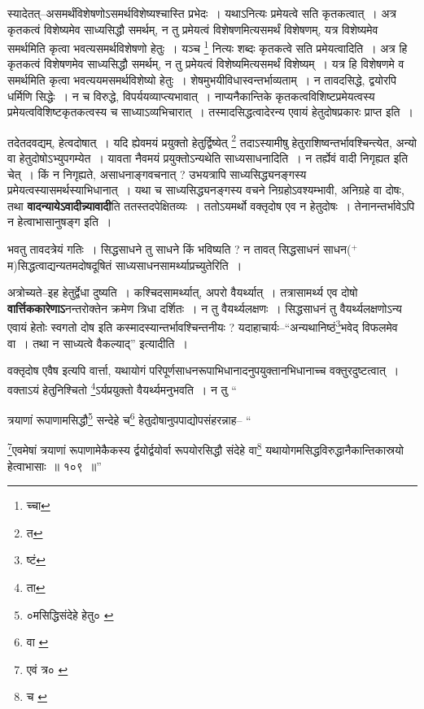 \documentclass[article,12pt,a4paper]{memoir}
\newcommand{\add}[1]{($^{+}$#1)}
\begin{document}
	  \pstart स्यादेतत्--असमर्थंविशेषणोऽसमर्थविशेष्यश्चास्ति प्रभेदः । यथाऽनित्यः प्रमेयत्वे सति कृतकत्वात् । अत्र कृतकत्वं विशेष्यमेव साध्यसिद्धौ समर्थम्, न तु प्रमेयत्वं विशेषणमित्यसमर्थं विशेषणम्, यत्र विशेष्यमेव समर्थमिति कृत्वा भवत्यसमर्थविशेषणो हेतुः । यञ्च \footnote{च्चा} नित्यः शब्दः कृतकत्वे सति प्रमेयत्वादिति । अत्र हि कृतकत्वं विशेषणमेव साध्यसिद्धौ समर्थम्, न तु प्रमेयत्वं विशेष्यमित्यसमर्थं विशेष्यम् । यत्र हि विशेषणमे \leavevmode{} व समर्थमिति कृत्वा भवत्ययमसमर्थविशेष्यो हेतुः । शेषमुभयीविधास्वन्तर्भाव्यताम् । न तावदसिद्धे, द्वयोरपि धर्मिणि सिद्धेः । न च विरुद्धे, विपर्ययव्याप्त्यभावात् । नाप्यनैकान्तिके कृतकत्वविशिष्टप्रमेयत्वस्य प्रमेयत्वविशिष्टकृतकत्वस्य च साध्याऽव्यभिचारात् । तस्मादसिद्धत्वादेरन्य एवायं हेतुदोषप्रकारः प्राप्त इति ।
	\pend
      

	  \pstart तदेतदवद्यम्, हेत्वदोषात् । यदि ह्येवमयं प्रयुक्तो हेतुर्द्विष्येत् \footnote{त} तदाऽस्यामीषु हेतुराशिष्वन्तर्भावश्चिन्त्येत, अन्यो वा हेतुदोषोऽभ्युपगम्येत । यावता नैवमयं प्रयुक्तोऽन्यथेति साध्यसाधनादिति । न तर्ह्येवं वादी निगृह्यत इति चेत् । किं न निगृह्यते, असाधनाङ्गवचनात् ? उभयत्रापि साध्यसिद्ध्यनङ्गस्य प्रमेयत्वस्यासमर्थस्याभिधानात् । यथा च साध्यसिद्ध्यनङ्गस्य वचने निग्रहोऽवश्यम्भावी, अनिग्रहे वा दोषः, तथा \textbf{वादन्यायेऽवादीन्न्यावादी}ति ततस्तदपेक्षितव्यः । ततोऽयमर्थो वक्तृदोष एव न हेतुदोषः । तेनानन्तर्भावेऽपि न हेत्वाभासानुषङ्ग इति ।
	\pend
      

	  \pstart भवतु तावदत्रेयं गतिः । सिद्धसाधने तु साधने किं भविष्यति ? न तावत् सिद्धसाधनं साधन\add{म}सिद्धत्वाद्यन्यतमदोषदूषितं साध्यसाधनसामर्थ्याप्रच्युतेरिति ।
	\pend
      

	  \pstart अत्रोच्यते--इह हेतुर्द्वेधा दुष्यति । कश्चिदसामर्थ्यात्, अपरो वैयर्थ्यात् । तत्रासामर्थ्य एव दोषो \textbf{वार्त्तिककारेणाऽ}नन्तरोक्तेन क्रमेण त्रिधा दर्शितः । न तु वैयर्थ्यलक्षणः । सिद्धसाधनं तु वैयर्थ्यलक्षणोऽन्य एवायं हेतोः स्वगतो दोष इति कस्मादस्यान्तर्भावश्चिन्तनीयः ? यदाहाचार्यः--“अन्यथानिष्ठं\footnote{ष्टं}भवेद् विफलमेव वा । तथा न साध्यत्वे वैकल्याद्” इत्यादीति ।
	\pend
      

	  \pstart वक्तृदोष एवैष इत्यपि वार्त्ता, यथायोगं परिपूर्णसाधनरूपाभिधानादनुपयुक्तानभिधानाच्च वक्तुरदुष्टत्वात् । वक्ताऽयं हेतुनिश्चितो \footnote{ता}ऽर्यप्रयुक्तो वैयर्थ्यमनुभवति । न तु \leavevmode{} “
	  
	त्रयाणां रूपाणामसिद्धौ\footnote{०मसिद्धिसंदेहे हेतु० \cite{dp-msC}} सन्देहे च\footnote{वा \cite{dp-msD}} हेतुदोषानुपपाद्योपसंहरन्नाह-- “
	  
	\footnote{एवं त्र० \cite{dp-msB} \cite{dp-msD} \cite{dp-edP} \cite{dp-edH} \cite{dp-edE} \cite{dp-edN}}एवमेषां त्रयाणां रूपाणामेकैकस्य र्द्वयोर्द्वयोर्वा रूपयोरसिद्धौ संदेहे वा\footnote{च \cite{dp-msB} \cite{dp-edP} \cite{dp-edH} \cite{dp-edE} \cite{dp-edN}} यथायोगमसिद्धविरुद्धानैकान्तिकास्रयो हेत्वाभासाः ॥ १०९ ॥” 
	  
\end{document}
